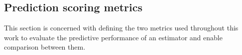 

\subsection{Prediction scoring metrics}
\label{sec:prediction_metrics}


This section is concerned with defining the two metrics used throughout this work to evaluate the predictive performance of an estimator and enable comparison between them. %

